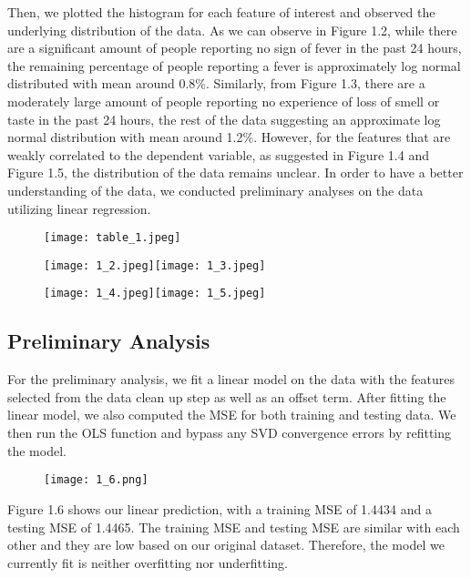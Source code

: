\documentclass[10pt, a4paper, twocolumn]{article} %
\begin{document}
Then, we plotted the histogram for each feature of interest and observed the underlying distribution of the data. As we can observe in Figure 1.2, while there are a significant amount of people reporting no sign of fever in the past 24 hours, the remaining percentage of people reporting a fever is approximately log normal distributed with mean around 0.8\%. Similarly, from Figure 1.3, there are a moderately large  amount of people reporting no experience of loss of smell or taste in the past 24 hours, the rest of the data suggesting an approximate log normal distribution with mean around 1.2\%. However, for the features that are weakly correlated to the dependent variable, as suggested in Figure 1.4 and Figure 1.5, the distribution of the data remains unclear. In order to have a better understanding of the data, we conducted preliminary analyses on the data utilizing linear regression.

\begin{figure}[t]
\begin{center}
\texttt{[image: table\_1.jpeg]} 
\end{center}
\end{figure}
\begin{figure}[H]
    \centering
	\texttt{[image: 1\_2.jpeg]}\hfill \hfill\texttt{[image: 1\_3.jpeg]}
\end{figure}
\begin{figure}
    \centering
	\texttt{[image: 1\_4.jpeg]}\hfill \hfill\texttt{[image: 1\_5.jpeg]}
\end{figure}
\newpage
\subsection{Preliminary Analysis}


For the preliminary analysis, we fit a linear model on the data
 with the features selected from the data clean up step as well as an offset term. After fitting the linear model, we also computed the MSE for both training and testing data. We then run the OLS function and bypass any SVD convergence errors by refitting the model. 
 
\begin{figure}[H]
	\texttt{[image: 1\_6.png]} 
\end{figure}
 
 \vspace*{13\baselineskip}
 Figure 1.6 shows our linear prediction, with a training MSE of 1.4434 and a testing MSE of 1.4465. The training MSE and testing MSE are similar with each other and they are low based on our original dataset. Therefore, the model we currently fit is neither overfitting nor underfitting.
 
\end{document}
